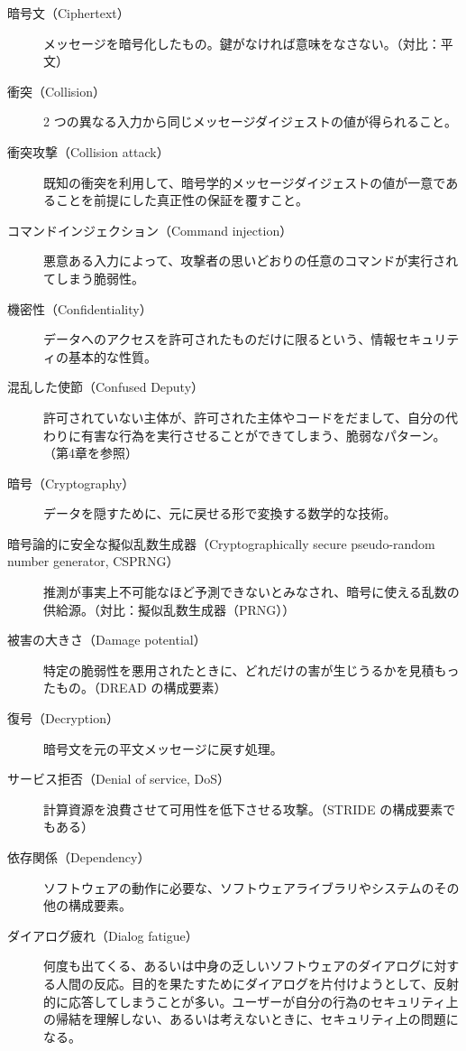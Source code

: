 \documentclass[uplatex]{jsarticle}
\begin{document}
\begin{description}
\item[暗号文（Ciphertext）]
メッセージを暗号化したもの。鍵がなければ意味をなさない。（対比：平文）

\item[衝突（Collision）]
2 つの異なる入力から同じメッセージダイジェストの値が得られること。

\item[衝突攻撃（Collision attack）]
既知の衝突を利用して、暗号学的メッセージダイジェストの値が一意であることを前提にした真正性の保証を覆すこと。

\item[コマンドインジェクション（Command injection）]
悪意ある入力によって、攻撃者の思いどおりの任意のコマンドが実行されてしまう脆弱性。

\item[機密性（Confidentiality）]
データへのアクセスを許可されたものだけに限るという、情報セキュリティの基本的な性質。

\item[混乱した使節（Confused Deputy）]
許可されていない主体が、許可された主体やコードをだまして、自分の代わりに有害な行為を実行させることができてしまう、脆弱なパターン。（第4章を参照）

\item[暗号（Cryptography）]
データを隠すために、元に戻せる形で変換する数学的な技術。

\item[暗号論的に安全な擬似乱数生成器（Cryptographically secure pseudo-random number generator, CSPRNG）]
推測が事実上不可能なほど予測できないとみなされ、暗号に使える乱数の供給源。（対比：擬似乱数生成器（PRNG））

\item[被害の大きさ（Damage potential）]
特定の脆弱性を悪用されたときに、どれだけの害が生じうるかを見積もったもの。（DREAD の構成要素）

\item[復号（Decryption）]
暗号文を元の平文メッセージに戻す処理。

\item[サービス拒否（Denial of service, DoS）]
計算資源を浪費させて可用性を低下させる攻撃。（STRIDE の構成要素でもある）

\item[依存関係（Dependency）]
ソフトウェアの動作に必要な、ソフトウェアライブラリやシステムのその他の構成要素。

\item[ダイアログ疲れ（Dialog fatigue）]
何度も出てくる、あるいは中身の乏しいソフトウェアのダイアログに対する人間の反応。目的を果たすためにダイアログを片付けようとして、反射的に応答してしまうことが多い。ユーザーが自分の行為のセキュリティ上の帰結を理解しない、あるいは考えないときに、セキュリティ上の問題になる。


\end{description}
\end{document}
